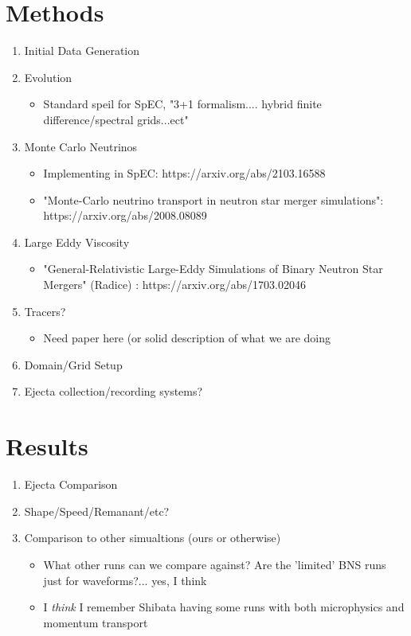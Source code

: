 \documentclass[%
twocolumn,
superscriptaddress,
nofootinbib,
 amsmath,amssymb,
 aps, prd
]{revtex4-2}
\begin{document}
\section{Methods}
\begin{enumerate}
  \item Initial Data Generation
  \item Evolution
    \begin{itemize}
      \item Standard speil for SpEC, "3+1 formalism.... hybrid finite difference/spectral grids...ect"
    \end{itemize}
  \item Monte Carlo Neutrinos
    \begin{itemize}
      \item Implementing in SpEC: https://arxiv.org/abs/2103.16588
      \item "Monte-Carlo neutrino transport in neutron star merger simulations": https://arxiv.org/abs/2008.08089
    \end{itemize}
  \item Large Eddy Viscosity
    \begin{itemize}
      \item "General-Relativistic Large-Eddy Simulations of Binary Neutron Star Mergers" (Radice) : https://arxiv.org/abs/1703.02046
    \end{itemize}
  \item Tracers?
    \begin{itemize}
      \item Need paper here (or solid description of what we are doing
    \end{itemize}
  \item Domain/Grid Setup
  \item Ejecta collection/recording systems?
\end{enumerate}

\section{Results}
\begin{enumerate}
  \item Ejecta Comparison
  \item Shape/Speed/Remanant/etc?
  \item Comparison to other simualtions (ours or otherwise)
    \begin{itemize}
      \item What other runs can we compare against? Are the 'limited' BNS runs just for waveforms?... yes, I think
      \item I \textit{think} I remember Shibata having some runs with both microphysics and momentum transport
    \end{itemize}
\end{enumerate}
\end{document}
